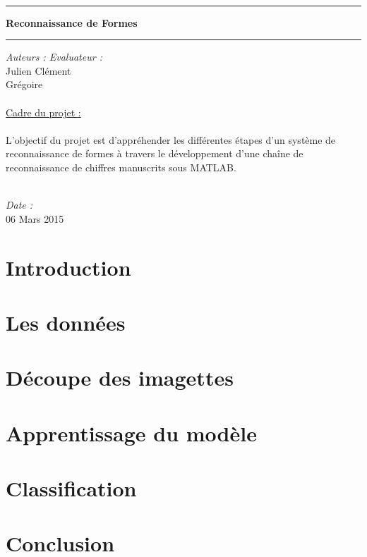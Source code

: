 \documentclass[a4paper,12pt]{report}
\begin{document}
\begin{titlepage}
\begin{center}
        \huge{} \\
        \rule{\linewidth}{1.5pt}
        \huge{\textbf{Reconnaissance de Formes}}
        \rule{\linewidth}{1.5pt} \newline{} \newline{}
    \end{center}
    \textit{Auteurs : \hfill Evaluateur :} \\ Julien  \hfill Clément  \\ 
                                                Grégoire  \\ \\
    \large{\underline{Cadre du projet : }} \\ \\
    \normalsize{L'objectif du projet est d'appréhender les différentes
        étapes d'un système de reconnaissance de formes à travers le
        développement d'une chaîne de reconnaissance de chiffres 
        manuscrits sous MATLAB.} \\ \\
    \begin{center}
        \textit{Date :} \\ 06 Mars 2015
    \end{center}
\end{titlepage}

\tableofcontents

\chapter*{Introduction}


\chapter{Les données}


\chapter{Découpe des imagettes}


\chapter{Apprentissage du modèle}


\chapter{Classification}


\chapter{Conclusion}

\end{document}

